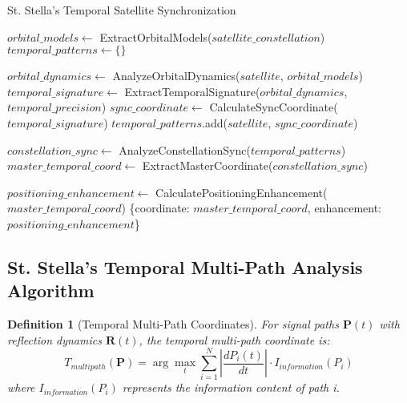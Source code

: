 \documentclass[12pt,a4paper]{article}
\newtheorem{definition}{Definition}
\begin{document}
\begin{algorithm}
\caption{St. Stella's Temporal Satellite Synchronization}
\begin{algorithmic}
    \State $orbital\_models \gets$ ExtractOrbitalModels($satellite\_constellation$)
    \State $temporal\_patterns \gets \{\}$
    
        \State $orbital\_dynamics \gets$ AnalyzeOrbitalDynamics($satellite$, $orbital\_models$)
        \State $temporal\_signature \gets$ ExtractTemporalSignature($orbital\_dynamics$, $temporal\_precision$)
        \State $sync\_coordinate \gets$ CalculateSyncCoordinate($temporal\_signature$)
        \State $temporal\_patterns$.add($satellite$, $sync\_coordinate$)
    \EndFor
    
    \State $constellation\_sync \gets$ AnalyzeConstellationSync($temporal\_patterns$)
    \State $master\_temporal\_coord \gets$ ExtractMasterCoordinate($constellation\_sync$)
    
    \State $positioning\_enhancement \gets$ CalculatePositioningEnhancement($master\_temporal\_coord$)
    \State \Return \{coordinate: $master\_temporal\_coord$, enhancement: $positioning\_enhancement$\}
\EndProcedure
\end{algorithmic}
\end{algorithm}

\subsection{St. Stella's Temporal Multi-Path Analysis Algorithm}

\begin{definition}[Temporal Multi-Path Coordinates]
For signal paths $\mathbf{P}(t)$ with reflection dynamics $\mathbf{R}(t)$, the temporal multi-path coordinate is:
\begin{equation}
T_{multipath}(\mathbf{P}) = \arg\max_{t} \sum_{i=1}^{N} \left| \frac{dP_i(t)}{dt} \right| \cdot I_{information}(P_i)
\end{equation}
where $I_{information}(P_i)$ represents the information content of path i.
\end{definition}
\end{document}
